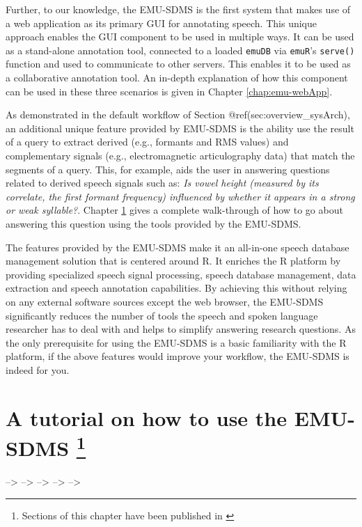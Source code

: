 \documentclass[]{book}
\let\rmarkdownfootnote\footnote%
\def\footnote{\protect\rmarkdownfootnote}
\theoremstyle{definition}
\theoremstyle{definition}
\theoremstyle{definition}
\theoremstyle{remark}
\begin{document}
Further, to our knowledge, the EMU-SDMS is the first system that makes
use of a web application as its primary GUI for annotating speech. This
unique approach enables the GUI component to be used in multiple ways.
It can be used as a stand-alone annotation tool, connected to a loaded
\texttt{emuDB} via \texttt{emuR}'s \texttt{serve()} function and used to
communicate to other servers. This enables it to be used as a
collaborative annotation tool. An in-depth explanation of how this
component can be used in these three scenarios is given in Chapter
\ref{chap:emu-webApp}.

As demonstrated in the default workflow of Section
@ref(sec:overview\_sysArch), an additional unique feature provided by
EMU-SDMS is the ability use the result of a query to extract derived
(e.g., formants and RMS values) and complementary signals (e.g.,
electromagnetic articulography data) that match the segments of a query.
This, for example, aids the user in answering questions related to
derived speech signals such as: \emph{Is vowel height (measured by its
correlate, the first formant frequency) influenced by whether it appears
in a strong or weak syllable?}. Chapter \ref{chap:tutorial} gives a
complete walk-through of how to go about answering this question using
the tools provided by the EMU-SDMS.

The features provided by the EMU-SDMS make it an all-in-one speech
database management solution that is centered around R. It enriches the
R platform by providing specialized speech signal processing, speech
database management, data extraction and speech annotation capabilities.
By achieving this without relying on any external software sources
except the web browser, the EMU-SDMS significantly reduces the number of
tools the speech and spoken language researcher has to deal with and
helps to simplify answering research questions. As the only prerequisite
for using the EMU-SDMS is a basic familiarity with the R platform, if
the above features would improve your workflow, the EMU-SDMS is indeed
for you.

\chapter[A tutorial on how to use the EMU-SDMS ]{\texorpdfstring{A
tutorial on how to use the EMU-SDMS \footnote{Sections of this chapter
  have been published in \citet{winkelmann:2017aa}}}{A tutorial on how to use the EMU-SDMS }}\label{chap:tutorial}

--\textgreater{} --\textgreater{} --\textgreater{} --\textgreater{}
--\textgreater{}
\end{document}
